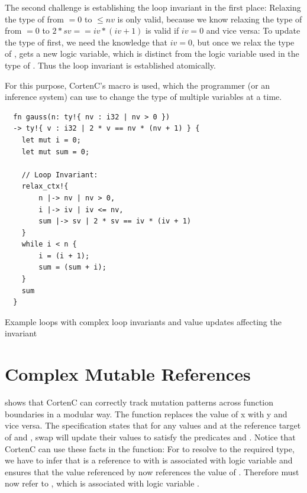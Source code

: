 \documentclass[twoside, english, final]{sdqthesis}
\theoremstyle{definition}
\begin{document}
The second challenge is establishing the loop invariant in the first place: Relaxing the type of  from $= 0$ to $\leq nv$ is only valid, because we know relaxing the type of  from $= 0$ to $ 2 * sv == iv * (iv + 1)$ is valid if $iv = 0$ and vice versa: To update the type of  first, we need the knowledge that $iv = 0$, but once we relax the type of ,  gets a new logic variable, which is distinct from the logic variable used in the type of . Thus the loop invariant is established atomically.

For this purpose, CortenC's  macro is used, which the programmer (or an inference system) can use to change the type of multiple variables at a time.

\begin{listing}[h]
  \begin{verbatim}
  fn gauss(n: ty!{ nv : i32 | nv > 0 }) 
  -> ty!{ v : i32 | 2 * v == nv * (nv + 1) } {
    let mut i = 0;
    let mut sum = 0;
    
    // Loop Invariant:
    relax_ctx!{
        n |-> nv | nv > 0,
        i |-> iv | iv <= nv,
        sum |-> sv | 2 * sv == iv * (iv + 1)
    }
    while i < n {
        i = (i + 1);
        sum = (sum + i);
    }
    sum
  }
  \end{verbatim}
  \caption{Example loops with complex loop invariants and value updates affecting the invariant}
  \label{lst:gauss}
\end{listing}

\label{subsec:evaluation-complex-mutable-ref}\section{Complex Mutable References}

 shows that CortenC can correctly track mutation patterns across function boundaries in a modular way. 
The  function replaces the value of x with y and vice versa. The specification states that for any values  and  at the reference target of  and , swap will update their values to satisfy the predicates  and .
Notice that CortenC can use these facts in the  function: For  to resolve to the required type, we have to infer that  is a reference to  with is associated with logic variable  and  ensures that the value referenced by  now references the value of . Therefore  must now refer to , which is associated with logic variable .
\end{document}
